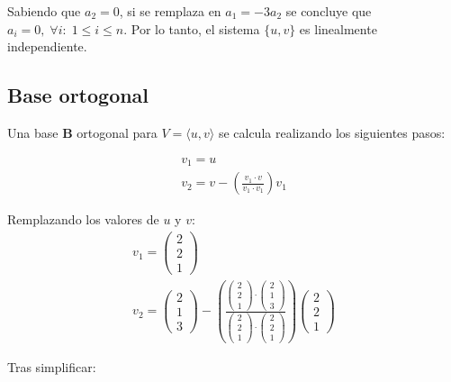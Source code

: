 \documentclass[a4paper,spanish]{article}
\begin{document}
Sabiendo que $a_2 = 0$, si se remplaza en $a_1=-3a_2$ se concluye que $a_i = 0, \; \forall i: \; 1\leq i \leq n$. Por lo tanto, el sistema $\{u,v\}$ es linealmente independiente.

\subsection*{Base ortogonal}
Una base $\mathbf{B}$ ortogonal para $V=\langle u,v \rangle$ se calcula realizando los siguientes pasos:

\begin{align*}
    v_1 = u \\
    v_2 = v - \left(\frac{v_1 \cdot v}{v_1 \cdot v_1}\right) v_1
\end{align*}

Remplazando los valores de $u$ y $v$:
\begin{align*}
    v_1 = \left(\begin{matrix}2 \\2\\1\end{matrix}\right) \\
    v_2 = \left(\begin{matrix}2 \\1\\3\end{matrix}\right) - \left(\frac{\left(\begin{matrix}2 \\2\\1\end{matrix}\right) \cdot \left(\begin{matrix}2 \\1\\3\end{matrix}\right)}{\left(\begin{matrix}2 \\2\\1\end{matrix}\right) \cdot \left(\begin{matrix}2 \\2\\1\end{matrix}\right)}\right) \left(\begin{matrix}2 \\2\\1\end{matrix}\right)
\end{align*}

Tras simplificar:
\end{document}
